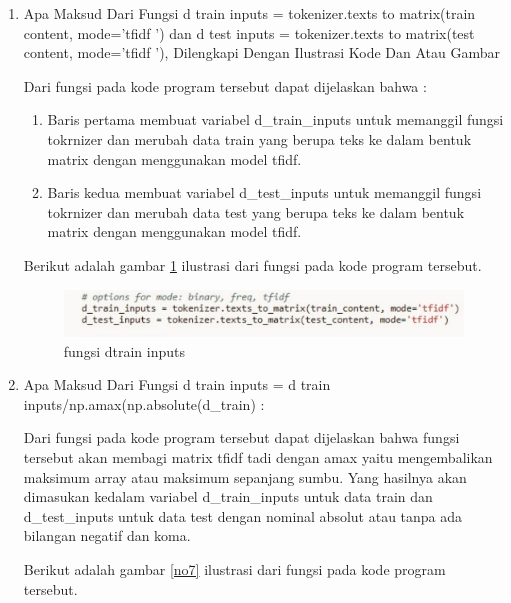 \begin{enumerate}
\item  Apa Maksud Dari Fungsi d train inputs = tokenizer.texts to matrix(train content, mode=’tfidf ’) dan d test inputs = tokenizer.texts to matrix(test content, mode=’tfidf ’), Dilengkapi Dengan Ilustrasi Kode Dan Atau Gambar

	
		
	\par Dari fungsi pada kode program tersebut dapat dijelaskan bahwa :
	\begin{enumerate}
	\item Baris pertama membuat variabel d\_train\_inputs untuk memanggil fungsi tokrnizer dan merubah data train yang berupa teks ke dalam bentuk matrix dengan menggunakan model tfidf.
	\item Baris kedua membuat variabel d\_test\_inputs untuk memanggil fungsi tokrnizer dan merubah data test yang berupa teks ke dalam bentuk matrix dengan menggunakan model tfidf.
	\end{enumerate}
	
	\par Berikut adalah gambar \ref{no6} ilustrasi dari fungsi pada kode program tersebut.
	
		\begin{figure}[!hbtp]
		\centering
		\includegraphics[scale=0.4]{figures/chapter7/no6.jpg}
		\caption{fungsi dtrain inputs}
		\label{no6}
		\end{figure}

\item Apa Maksud Dari Fungsi d train inputs = d train inputs/np.amax(np.absolute(d\_train) :
	
		
	\par Dari fungsi pada kode program tersebut dapat dijelaskan bahwa fungsi tersebut akan membagi matrix tfidf tadi dengan amax yaitu mengembalikan maksimum array atau maksimum sepanjang sumbu. Yang hasilnya akan dimasukan kedalam variabel d\_train\_inputs untuk data train dan d\_test\_inputs untuk data test dengan nominal absolut atau tanpa ada bilangan negatif dan koma.
	
	\par Berikut adalah gambar \ref{no7} ilustrasi dari fungsi pada kode program tersebut.
	

\end{enumerate}
